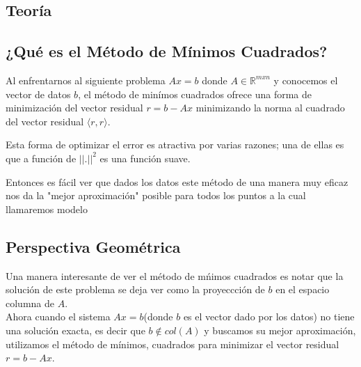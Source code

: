 \documentclass[12pt]{article}
\begin{document}
\vspace{21cm}




\begin{center}
    \section{Teor\'ia}

\end{center}
\vspace{1.5cm}


\subsection{¿Qu\'e es el M\'etodo de M\'inimos Cuadrados?}\vspace{0.5cm} 

Al enfrentarnos al siguiente problema $Ax=b$ donde $A\in\mathbb{R}^{mxn}$ y  conocemos el vector de datos $b$, el m\'etodo de min\'imos cuadrados ofrece una forma de minimizaci\'on del vector residual $r=b-Ax$ minimizando la norma al cuadrado del vector residual $\langle r,r \rangle$.

Esta forma de optimizar el error es atractiva por varias razones; una de ellas es que a funci\'on de $||.||^2$ es una funci\'on suave.

Entonces es f\'acil ver que dados los datos este m\'etodo de una manera muy eficaz nos da la "mejor aproximaci\'on" posible para todos los puntos a la cual llamaremos modelo
\vspace{0.7cm}



\begin{center}
    \section{Perspectiva Geom\'etrica}
\end{center}
\vspace{0.7cm}
Una manera interesante de ver el m\'etodo de m\'nimos cuadrados es notar que la soluci\'on de este problema se deja ver como la proyeccci\'on  de $b$ en el espacio columna de $A$.\\

Ahora cuando el sistema $Ax=b$(donde $b$ es el vector dado por los datos) no tiene una soluci\'on exacta, es decir que $b\notin col(A)$ y buscamos su mejor aproximaci\'on, utilizamos el m\'etodo de m\'inimos, cuadrados para minimizar el vector residual $r=b-Ax$.\\
\end{document}
